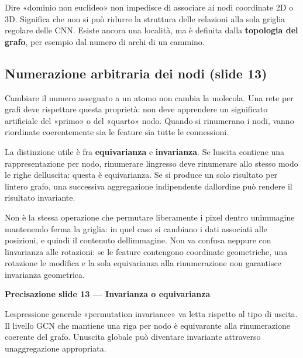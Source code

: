 \documentclass[11pt,a4paper,oneside,openany]{book}
\renewenvironment{quote}{\list{}{\leftmargin=1em\rightmargin=0pt}\item\relax}{\endlist}
\begin{document}
Dire «dominio non euclideo» non impedisce di associare ai nodi coordinate 2D o 3D. Significa che non si può ridurre la struttura delle relazioni alla sola griglia regolare delle CNN. Esiste ancora una località, ma è definita dalla \textbf{topologia del grafo}, per esempio dal numero di archi di un cammino.

\subsection{Numerazione arbitraria dei nodi (slide 13)}\label{f05-r83}

Cambiare il numero assegnato a un atomo non cambia la molecola. Una rete per grafi deve rispettare questa proprietà: non deve apprendere un significato artificiale del «primo» o del «quarto» nodo. Quando si rinumerano i nodi, vanno riordinate coerentemente sia le feature sia tutte le connessioni.

La distinzione utile è fra \textbf{equivarianza} e \textbf{invarianza}. Se l\textquotesingle uscita contiene una rappresentazione per nodo, rinumerare l\textquotesingle ingresso deve rinumerare allo stesso modo le righe dell\textquotesingle uscita: questa è equivarianza. Se si produce un solo risultato per l\textquotesingle intero grafo, una successiva aggregazione indipendente dall\textquotesingle ordine può rendere il risultato invariante.

Non è la stessa operazione che permutare liberamente i pixel dentro un\textquotesingle immagine mantenendo ferma la griglia: in quel caso si cambiano i dati associati alle posizioni, e quindi il contenuto dell\textquotesingle immagine. Non va confusa neppure con l\textquotesingle invarianza alle rotazioni: se le feature contengono coordinate geometriche, una rotazione le modifica e la sola equivarianza alla rinumerazione non garantisce invarianza geometrica.

\begin{quote}
\textbf{Precisazione slide 13 --- Invarianza o equivarianza}
\end{quote}

\begin{quote}
L\textquotesingle espressione generale «permutation invariance» va letta rispetto al tipo di uscita. Il livello GCN che mantiene una riga per nodo è equivarante alla rinumerazione coerente del grafo. Un\textquotesingle uscita globale può diventare invariante attraverso un\textquotesingle aggregazione appropriata.
\end{quote}
\end{document}
